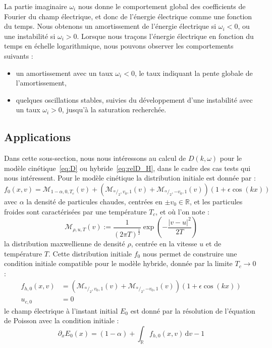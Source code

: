 La partie imaginaire $\omega_i$ nous donne le comportement global des coefficients de Fourier du champ électrique, et donc de l'énergie électrique comme une fonction du temps. Nous obtenons un amortissement de l'énergie électrique si $\omega_i < 0$, ou une instabilité si $\omega_i >0$. Lorsque nous traçons l'énergie électrique en fonction du temps en échelle logarithmique, nous pouvons observer les comportements suivants :
\begin{itemize}
  \item un amortissement avec un taux $\omega_i<0$, le taux indiquant la pente globale de l'amortissement,
  \item quelques oscillations stables, suivies du développement d'une instabilité avec un taux $\omega_i>0$, jusqu'à la saturation recherchée.
\end{itemize}

\subsection{Applications}\label{ssec:disp_appl}

Dans cette sous-section, nous nous intéressons au calcul de $D(k,\omega)$ pour le modèle cinétique~\eqref{eq:D} ou hybride~\eqref{eq:relD_H}, dans le cadre des cas tests qui nous intéressent. Pour le modèle cinétique la distribution initiale est donnée par :
$$
  f_0(x,v) = \mathcal{M}_{1-\alpha,0,T_c}(v)
    + \left(
      \mathcal{M}_{^\alpha/_2,v_0,1}(v) + \mathcal{M}_{^\alpha/_2,-v_0,1}(v)
    \right)(1+\epsilon\cos(kx))
$$
avec $\alpha$ la densité de particules chaudes, centrées en $\pm v_0\in\mathbb{R}$, et les particules froides sont caractérisées par une température $T_c$, et où l'on note :
$$
  \mathcal{M}_{\rho,u,T}(v) := \frac{1}{(2\pi T)^\frac{1}{2}}\exp\left(-\frac{|v-u|^2}{2T}\right)
$$
la distribution maxwellienne de densité $\rho$, centrée en la vitesse $u$ et de température $T$. Cette distribution initiale $f_0$ nous permet de construire une condition initiale compatible pour le modèle hybride, donnée par la limite $T_c\to 0$ :
\begin{equation}
  \begin{aligned}
    f_{h,0} (x,v) & = \left(
      \mathcal{M}_{^\alpha/_2,v_0,1}(v) + \mathcal{M}_{^\alpha/_2,-v_0,1}(v)
    \right)(1+\epsilon\cos(kx)) \\
    u_{c,0} & = 0
  \end{aligned}
\label{eq:f0hdexv}\end{equation}
le champ électrique à l'instant initial $E_0$ est donné par la résolution de l'équation de Poisson avec la condition initiale :
$$
  \partial_x E_0(x) = (1-\alpha) + \int_\mathbb{R}f_{h,0}(x,v)\,\mathrm{d}v - 1
$$

